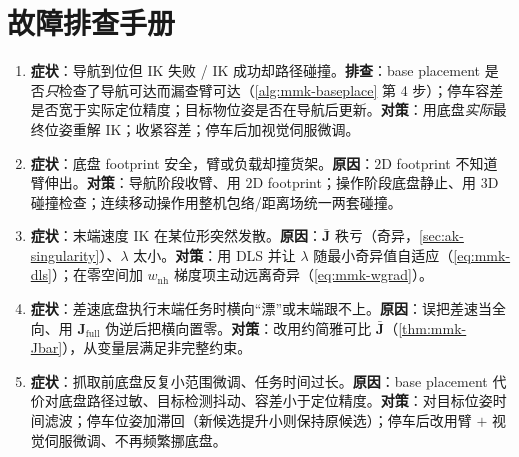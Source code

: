 \section*{故障排查手册}
\begin{enumerate}
  \item \textbf{症状}：导航到位但 IK 失败 / IK 成功却路径碰撞。\textbf{排查}：base placement 是否\emph{只}检查了导航可达而漏查臂可达（\cref{alg:mmk-baseplace} 第 4 步）；停车容差是否宽于实际定位精度；目标物位姿是否在导航后更新。\textbf{对策}：用底盘\emph{实际}最终位姿重解 IK；收紧容差；停车后加视觉伺服微调。
  \item \textbf{症状}：底盘 footprint 安全，臂或负载却撞货架。\textbf{原因}：$2$D footprint 不知道臂伸出。\textbf{对策}：导航阶段收臂、用 $2$D footprint；操作阶段底盘静止、用 $3$D 碰撞检查；连续移动操作用整机包络/距离场统一两套碰撞。
  \item \textbf{症状}：末端速度 IK 在某位形突然发散。\textbf{原因}：$\bar{\mathbf{J}}$ 秩亏（奇异，\cref{sec:ak-singularity}）、$\lambda$ 太小。\textbf{对策}：用 DLS 并让 $\lambda$ 随最小奇异值自适应（\cref{eq:mmk-dls}）；在零空间加 $w_{\text{nh}}$ 梯度项主动远离奇异（\cref{eq:mmk-wgrad}）。
  \item \textbf{症状}：差速底盘执行末端任务时横向“漂”或末端跟不上。\textbf{原因}：误把差速当全向、用 $\mathbf{J}_{\text{full}}$ 伪逆后把横向置零。\textbf{对策}：改用约简雅可比 $\bar{\mathbf{J}}$（\cref{thm:mmk-Jbar}），从变量层满足非完整约束。
  \item \textbf{症状}：抓取前底盘反复小范围微调、任务时间过长。\textbf{原因}：base placement 代价对底盘路径过敏、目标检测抖动、容差小于定位精度。\textbf{对策}：对目标位姿时间滤波；停车位姿加滞回（新候选提升小则保持原候选）；停车后改用臂 $+$ 视觉伺服微调、不再频繁挪底盘。
\end{enumerate}
